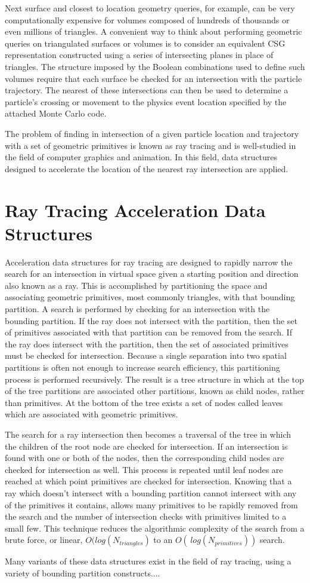 Next surface and closest to location geometry queries, for example, can be very
computationally expensive for volumes composed of hundreds of thousands or even
millions of triangles. A convenient way to think about performing geometric queries on
triangulated surfaces or volumes is to consider an equivalent CSG representation
constructed using a series of intersecting planes in place of triangles. The
structure imposed by the Boolean combinations used to define such volumes
require that each surface be checked for an intersection with the particle
trajectory. The nearest of these intersections can then be used to determine a
particle's crossing or movement to the physics event location specified by the
attached Monte Carlo code.

The problem of finding in intersection of a given particle location and
trajectory with a set of geometric primitives is known as ray tracing and is
well-studied in the field of computer graphics and animation. In this field,
data structures designed to accelerate the location of the nearest ray
intersection are applied.

\section{Ray Tracing Acceleration Data Structures}

Acceleration data structures for ray tracing are designed to rapidly narrow the
search for an intersection in virtual space given a starting position and
direction also known as a ray. This is accomplished by partitioning the space
and associating geometric primitives, most commonly triangles, with that
bounding partition. A search is performed by checking for an intersection with
the bounding partition. If the ray does not intersect with the partition, then
the set of primitives associated with that partition can be removed from the
search. If the ray does intersect with the partition, then the set of associated
primitives must be checked for intersection. Because a single separation into
two spatial partitions is often not enough to increase search efficiency, this
partitioning process is performed recursively. The result is a tree structure in
which at the top of the tree partitions are associated other partitions, known
as child nodes, rather than primitives. At the bottom of the tree exists a set of
nodes called leaves which are associated with geometric primitives. 

The search for a ray intersection then becomes a traversal of the tree
in which the children of the root node are checked for intersection. If an
intersection is found with one or both of the nodes, then the corresponding child nodes 
are checked for intersection as well. This process is repeated until leaf nodes
are reached at which point primitives are checked for intersection. Knowing that
a ray which doesn't intersect with a bounding partition cannot intersect with
any of the primitives it contains, allows many primitives to be rapidly removed
from the search and the number of intersection checks with primitives limited to
a small few. This technique reduces the algorithmic complexity of the search
from a brute force, or linear, $O(log(N_{triangles})$ to an $O(\,
log(N_{primitives}))$ search. 

Many variants of these data structures exist in the field of ray tracing, using
a variety of bounding partition constructs....

